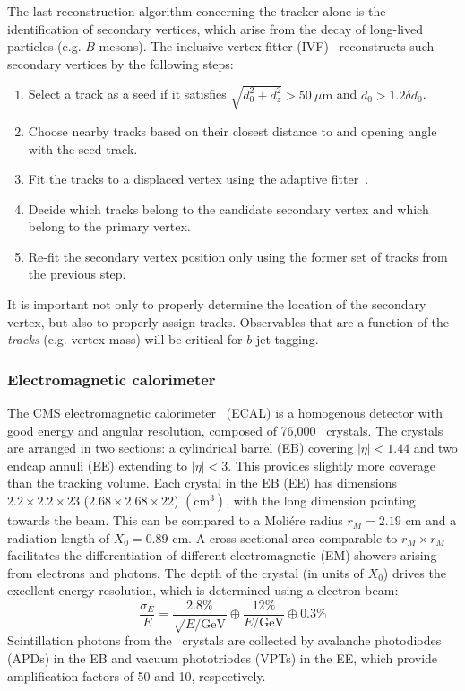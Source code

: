 The last reconstruction algorithm concerning the tracker alone is the identification of secondary vertices, which arise from the decay of long-lived particles (e.g. $B$ mesons).
The inclusive vertex fitter (IVF)~\cite{csvv2} reconstructs such secondary vertices by the following steps:
\begin{enumerate}
	\item Select a track as a seed if it satisfies $\sqrt{d_0^2 + d_z^2} > 50~\mu\mathrm{m}$ and $d_0 > 1.2 \delta d_0$.
	\item Choose nearby tracks based on their closest distance to and opening angle with the seed track.
	\item Fit the tracks to a displaced vertex using the adaptive fitter~\cite{adaptivefit}.
	\item Decide which tracks belong to the candidate secondary vertex and which belong to the primary vertex.
	\item Re-fit the secondary vertex position only using the former set of tracks from the previous step.
\end{enumerate}
It is important not only to properly determine the location of the secondary vertex, but also to properly assign tracks.
Observables that are a function of the \emph{tracks} (e.g. vertex mass) will be critical for $b$ jet tagging.

\subsubsection{Electromagnetic calorimeter}

The CMS electromagnetic calorimeter~\cite{cmsecaljinst} (ECAL) is a homogenous detector with good energy and angular resolution, composed of 76,000 \pbwo~crystals. 
The crystals are arranged in two sections: a cylindrical barrel (EB) covering $|\eta|<1.44$ and two endcap annuli (EE) extending to $|\eta|<3$.
This provides slightly more coverage than the tracking volume.
Each crystal in the EB (EE) has dimensions $2.2\times2.2\times23$ ($2.68\times2.68\times22$) $(\mathrm{cm}^3)$, with the long dimension pointing towards the beam.
This can be compared to a Moli\'ere radius $r_M=2.19$ cm and a radiation length of $X_0=0.89$ cm. 
A cross-sectional area comparable to $r_M\times r_M$ facilitates the differentiation of different electromagnetic (EM) showers arising from electrons and photons.
The depth of the crystal (in units of $X_0$) drives the excellent energy resolution, which is determined using a electron beam:
\begin{equation}
    \frac{\sigma_E}{E} = \frac{2.8\%}{\sqrt{E/\mathrm{GeV}}} \oplus \frac{12\%}{E/\mathrm{GeV}} \oplus 0.3\%
\end{equation}
Scintillation photons from the \pbwo~crystals are collected by avalanche photodiodes (APDs) in the EB and vacuum phototriodes (VPTs) in the EE, which provide amplification factors of 50 and 10, respectively. 

